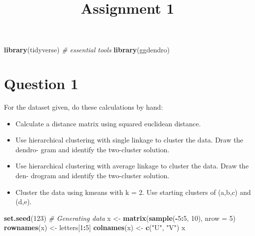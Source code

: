 \documentclass[]{article}
\title{Assignment 1}
\author{}
\date{}
\newenvironment{Shaded}{\begin{snugshade}}{\end{snugshade}}
\newcommand{\CommentTok}[1]{\textcolor[rgb]{0.56,0.35,0.01}{\textit{#1}}}
\newcommand{\DataTypeTok}[1]{\textcolor[rgb]{0.13,0.29,0.53}{#1}}
\newcommand{\DecValTok}[1]{\textcolor[rgb]{0.00,0.00,0.81}{#1}}
\newcommand{\KeywordTok}[1]{\textcolor[rgb]{0.13,0.29,0.53}{\textbf{#1}}}
\newcommand{\NormalTok}[1]{#1}
\newcommand{\OperatorTok}[1]{\textcolor[rgb]{0.81,0.36,0.00}{\textbf{#1}}}
\newcommand{\StringTok}[1]{\textcolor[rgb]{0.31,0.60,0.02}{#1}}
\providecommand{\tightlist}{%
  \setlength{\itemsep}{0pt}\setlength{\parskip}{0pt}}
\begin{document}
\maketitle

\begin{Shaded}
\begin{Highlighting}[]
\KeywordTok{library}\NormalTok{(tidyverse) }\CommentTok{# essential tools}
\KeywordTok{library}\NormalTok{(ggdendro)}
\end{Highlighting}
\end{Shaded}

\hypertarget{question-1}{%
\section{Question 1}\label{question-1}}

For the dataset given, do these calculations by hand:

\begin{itemize}
\tightlist
\item
  Calculate a distance matrix using squared euclidean distance.
\item
  Use hierarchical clustering with single linkage to cluster the data.
  Draw the dendro- gram and identify the two-cluster solution.
\item
  Use hierarchical clustering with average linkage to cluster the data.
  Draw the den- drogram and identify the two-cluster solution.
\item
  Cluster the data using kmeans with k = 2. Use starting clusters of
  (a,b,c) and (d,e).
\end{itemize}

\begin{Shaded}
\begin{Highlighting}[]
\KeywordTok{set.seed}\NormalTok{(}\DecValTok{123}\NormalTok{)}
\CommentTok{# Generating data}
\NormalTok{x <-}\StringTok{ }\KeywordTok{matrix}\NormalTok{(}\KeywordTok{sample}\NormalTok{(}\OperatorTok{-}\DecValTok{5}\OperatorTok{:}\DecValTok{5}\NormalTok{, }\DecValTok{10}\NormalTok{), }\DataTypeTok{nrow =} \DecValTok{5}\NormalTok{)}
\KeywordTok{rownames}\NormalTok{(x) <-}\StringTok{ }\NormalTok{letters[}\DecValTok{1}\OperatorTok{:}\DecValTok{5}\NormalTok{]}
\KeywordTok{colnames}\NormalTok{(x) <-}\StringTok{ }\KeywordTok{c}\NormalTok{(}\StringTok{"U"}\NormalTok{, }\StringTok{"V"}\NormalTok{)}
\NormalTok{x}
\end{Highlighting}
\end{Shaded}
\end{document}
